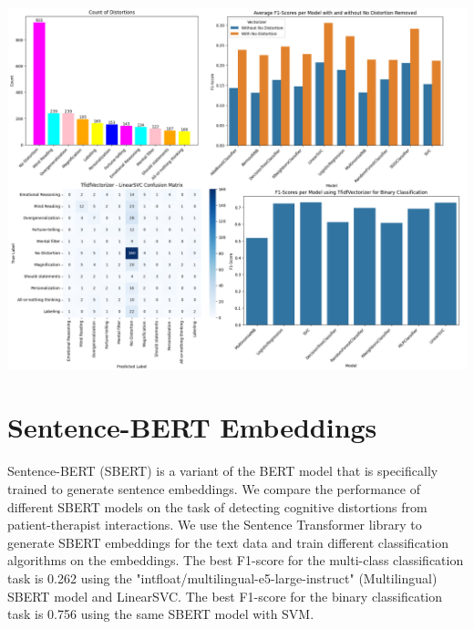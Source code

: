 \documentclass[a0,landscape]{a0poster}
\begin{document}
\begin{multicols}{4}
\begin{center}\vspace{0.5cm}
	\includegraphics[width=0.99\linewidth]{figures/1stFour.png}
	\label{figure1}
\end{center}\vspace{0.5cm}

\color{Teal}
\section*{Sentence-BERT Embeddings}
\color{Black}

Sentence-BERT (SBERT) is a variant of the BERT model that is specifically trained to generate sentence embeddings. 
We compare the performance of different SBERT models on the task of detecting cognitive distortions from patient-therapist interactions. 
We use the Sentence Transformer library to generate SBERT embeddings for the text data and train different classification algorithms on the embeddings. 
The best F1-score for the multi-class classification task is 0.262 using the "intfloat/multilingual-e5-large-instruct" (Multilingual) SBERT model and LinearSVC. 
The best F1-score for the binary classification task is 0.756 using the same SBERT model with SVM.


\end{multicols}
\end{document}
